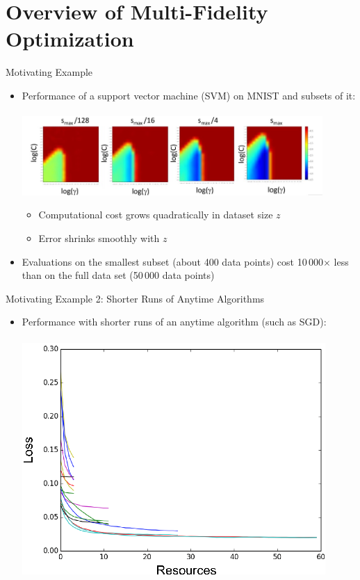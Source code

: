 \section{Overview of Multi-Fidelity Optimization}
\begin{frame}[c]{Motivating Example}

\begin{itemize}
    \item Performance of a support vector machine (SVM) on MNIST and subsets of it:\\~\\
	    \includegraphics[width=0.9\textwidth]{w07_hpo_grey_box/images/fabolas/example_mnist.jpg}
	    \begin{itemize}
            \item Computational cost grows quadratically in dataset size $z$
            \item Error shrinks smoothly with $z$
        \end{itemize}
\bigskip
    \item Evaluations on the smallest subset (about 400 data points) cost 10\,000$\times$ less than on the full data set (50\,000 data points)
    
\end{itemize}
\end{frame}

\begin{frame}[c]{Motivating Example 2: Shorter Runs of Anytime Algorithms}

\begin{itemize}
    \item Performance with shorter runs of an anytime algorithm (such as SGD):\\~\\
\centering
\includegraphics[width=0.5\linewidth]{w07_hpo_grey_box/images/hyperband/Figure_1_2.png}

\end{itemize}
\end{frame}


